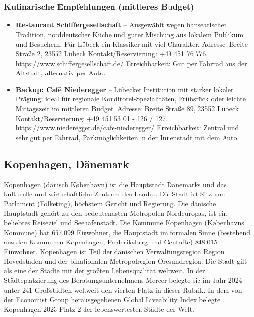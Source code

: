 \documentclass[a4paper,12pt]{article}
\begin{document}
\subsubsection{Kulinarische Empfehlungen (mittleres Budget)}
\begin{itemize}
\item \textbf{Restaurant Schiffergesellschaft} -- Ausgewählt wegen hanseatischer Tradition, norddeutscher Küche und guter Mischung aus lokalem Publikum und Besuchern. Für Lübeck ein Klassiker mit viel Charakter.\newline
Adresse: Breite Straße 2, 23552 Lübeck\newline
Kontakt/Reservierung: +49 451 76 776, \url{https://www.schiffergesellschaft.de/}\newline
Erreichbarkeit: Gut per Fahrrad aus der Altstadt, alternativ per Auto.

\item \textbf{Backup: Café Niederegger} -- Lübecker Institution mit starker lokaler Prägung; ideal für regionale Konditorei-Spezialitäten, Frühstück oder leichte Mittagszeit im mittleren Budget.\newline
Adresse: Breite Straße 89, 23552 Lübeck\newline
Kontakt/Reservierung: +49 451 53 01 - 126 / 127, \url{https://www.niederegger.de/cafe-niederegger/}\newline
Erreichbarkeit: Zentral und sehr gut per Fahrrad, Parkmöglichkeiten in der Innenstadt mit dem Auto.
\end{itemize}


\subsection{Kopenhagen, Dänemark}
Kopenhagen (dänisch København) ist die Hauptstadt Dänemarks und das kulturelle und wirtschaftliche Zentrum des Landes. Die Stadt ist Sitz von Parlament (Folketing), höchstem Gericht und Regierung. Die dänische Hauptstadt gehört zu den bedeutendsten Metropolen Nordeuropas, ist ein beliebtes Reiseziel und Seehafenstadt. Die Kommune Kopenhagen (Københavns Kommune) hat \mbox{667.099} Einwohner, die Hauptstadt im formalen Sinne (bestehend aus den Kommunen Kopenhagen, Frederiksberg und Gentofte) \mbox{848.015} Einwohner. Kopenhagen ist Teil der dänischen Verwaltungsregion Region Hovedstaden und der binationalen Metropolregion Öresundregion. Die Stadt gilt als eine der Städte mit der größten Lebensqualität weltweit. In der Städteplatzierung des Beratungsunternehmens Mercer belegte sie im Jahr 2024 unter 241 Großstädten weltweit den vierten Platz in dieser Rubrik. In dem von der Economist Group herausgegebenen Global Liveability Index belegte Kopenhagen 2023 Platz 2 der lebenswertesten Städte der Welt.
\end{document}
